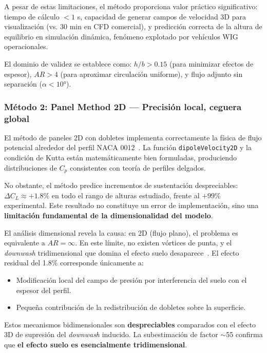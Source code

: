\documentclass[twocolumn]{article}
\begin{document}
A pesar de estas limitaciones, el método proporciona valor práctico significativo: tiempo de cálculo $< 1$ s, capacidad de generar campos de velocidad 3D para visualización (vs. 30 min en CFD comercial), y predicción correcta de la altura de equilibrio en simulación dinámica, fenómeno explotado por vehículos WIG operacionales.

El dominio de validez se establece como: $h/b > 0.15$ (para minimizar efectos de espesor), $AR > 4$ (para aproximar circulación uniforme), y flujo adjunto sin separación ($\alpha < 10°$).

\subsubsection{Método 2: Panel Method 2D --- Precisión local, ceguera global}

El método de paneles 2D con dobletes implementa correctamente la física de flujo potencial alrededor del perfil NACA 0012~\cite{hess1967}. La función \texttt{dipoleVelocity2D} y la condición de Kutta están matemáticamente bien formuladas, produciendo distribuciones de $C_p$ consistentes con teoría de perfiles delgados.

No obstante, el método predice incrementos de sustentación despreciables: $\Delta C_L \approx +1.8\%$ en todo el rango de alturas estudiado, frente al $+99\%$ experimental. Este resultado no constituye un error de implementación, sino una \textbf{limitación fundamental de la dimensionalidad del modelo}.

El análisis dimensional revela la causa: en 2D (flujo plano), el problema es equivalente a $AR = \infty$. En este límite, no existen vórtices de punta, y el \textit{downwash} tridimensional que domina el efecto suelo desaparece~\cite{ahmed2007}. El efecto residual del 1.8\% corresponde únicamente a:

\begin{itemize}
    \item Modificación local del campo de presión por interferencia del suelo con el espesor del perfil.
    \item Pequeña contribución de la redistribución de dobletes sobre la superficie.
\end{itemize}

Estos mecanismos bidimensionales son \textbf{despreciables} comparados con el efecto 3D de supresión del \textit{downwash} inducido. La subestimación de factor $\sim$55 confirma que \textbf{el efecto suelo es esencialmente tridimensional}.
\end{document}
